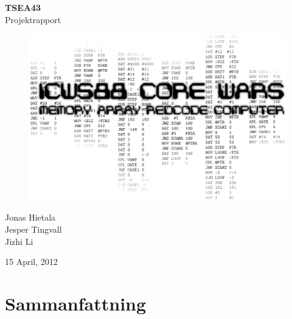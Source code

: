 \documentclass[11pt]{article}
\begin{document}
\begin{titlepage}

\begin{center}


\vspace*{1cm}

{ \Large \bfseries TSEA43}\\[0.2cm]
{ Projektrapport}\\[0.2cm]


\begin{figure}[h]
    \begin{center}
        \includegraphics[width=15cm]{Logo01.eps}
        \label{fig:Logo01}
    \end{center}
\end{figure}

\vspace*{2cm}

Jonas Hietala \\
Jesper Tingvall \\
Jizhi Li

\vfill

{\large 15 April, 2012}

\end{center}

\end{titlepage}
\newpage

\newpage
\thispagestyle{empty}
\mbox{}


\newpage
\section*{Sammanfattning}
\end{document}
